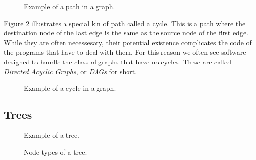 \begin{figure}[tbp]
  
  \caption{Example of a path in a graph.}
  \label{fig:bs:graphs:path}
\end{figure}

Figure \ref{fig:bs:graphs:cycle} illustrates a special kin of path called a cycle. This is a path where the destination node of the last edge is the same as the source node of the first edge. While they are often necessesary, their potential existence complicates the code of the programs that have to deal with them. For this reason we often see software designed to handle the class of graphs that have no cycles. These are called \textsl{Directed Acyclic Graphs}, or \textsl{DAGs} for short.

\begin{figure}[tbp]
  
  \caption{Example of a cycle in a graph.}
  \label{fig:bs:graphs:cycle}
\end{figure}

\subsection{Trees}

\begin{figure}[tbp]
  
  \caption{Example of a tree.}
  \label{fig:bs:graphs:trees}
\end{figure}

\begin{figure}[tbp]
  
  \caption{Node types of a tree.}
  \label{fig:bs:graphs:trees:nodetypes}
\end{figure}

